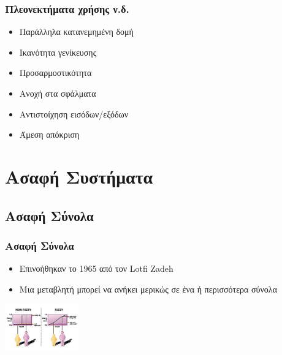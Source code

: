 \documentclass[xetex,serif,mathserif,14pt]{beamer}
\begin{document}
\begin{frame}
\frametitle{Πλεονεκτήματα χρήσης ν.δ.}
\begin{itemize}
\pause
  \item Παράλληλα κατανεμημένη δομή\pause
  \item Ικανότητα γενίκευσης\pause
  \item Προσαρμοστικότητα\pause
  \item Ανοχή στα σφάλματα\pause
  \item Αντιστοίχηση εισόδων/εξόδων\pause
  \item Άμεση απόκριση
\end{itemize}
\end{frame}


\section{Ασαφή Συστήματα}

\subsection{Ασαφή Σύνολα}

\begin{frame}
\frametitle{Ασαφή Σύνολα}
\begin{itemize}
  \item Επινοήθηκαν το 1965 από τον Lotfi Zadeh\pause
  \item Μια μεταβλητή μπορεί να ανήκει μερικώς σε ένα ή περισσότερα σύνολα
\end{itemize}
\centering
\includegraphics[height=2cm]{images/fuzzy.jpg}
\end{frame}
\end{document}
